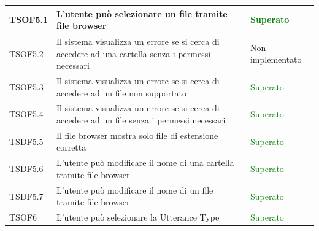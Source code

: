 \documentclass[openany,12pt,a4paper]{report}
\begin{document}
\begin{longtable}{| p{2cm} |p{8cm} | p{2.5cm} |}
	\newline TSOF5.1&
	\newline L'utente può selezionare un file tramite file browser&
	\newline \textcolor{green}{Superato}
	\\[1em]	
	\hline
	
	\newline TSOF5.2&
	\newline Il sistema visualizza un errore se si cerca di accedere ad una cartella senza i permessi necessari&
	\newline Non implementato
	\\[1em]	
	\hline
	
	\newline TSOF5.3&
	\newline Il sistema visualizza un errore se si cerca di accedere ad un file non supportato&
	\newline \textcolor{green}{Superato}
	\\[1em]	
	\hline
	
	\newline TSOF5.4&
	\newline Il sistema visualizza un errore se si cerca di accedere ad un file senza i permessi necessari&
	\newline \textcolor{green}{Superato}
	\\[1em]	
	\hline
	
	\newline TSDF5.5&
	\newline Il file browser mostra solo file di estensione corretta&
	\newline \textcolor{green}{Superato}
	\\[1em]
	\hline
	\newline TSDF5.6&
	\newline L'utente può modificare il nome di una cartella tramite file browser&
	\newline \textcolor{green}{Superato}
	\\[1em]
	\hline
	\newline TSDF5.7&
	\newline L'utente può modificare il nome di un file tramite file browser&
	\newline \textcolor{green}{Superato}
	\\[1em]
	\hline
	\newline TSOF6&
	\newline L'utente può selezionare la Utterance Type&
	\newline \textcolor{green}{Superato}
	\\[1em]
	\hline
	

\end{longtable}
\end{document}
